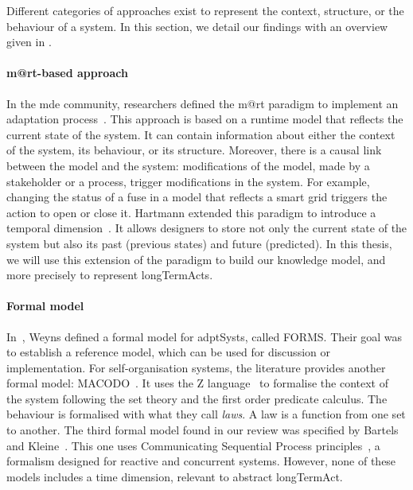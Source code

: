 Different categories of approaches exist to represent the \gls{context}, \gls{structure}, or the \gls{behaviour} of a system.
In this section, we detail our findings with an overview given in .

\paragraph{\Gls{m@rt}-based approach}
In the \gls{mde} community, researchers defined the \gls{m@rt} paradigm to implement an adaptation process~\cite{DBLP:journals/computer/BlairBF09, DBLP:journals/computer/MorinBJFS09}.
This approach is based on a runtime model that reflects the current state of the system.
It can contain information about either the \gls{context} of the system, its \gls{behaviour}, or its \gls{structure}.
Moreover, there is a causal link between the model and the system: modifications of the model, made by a stakeholder or a process, trigger modifications in the system.
For example, changing the status of a fuse in a model that reflects a smart grid triggers the action to open or close it.
Hartmann \etal extended this paradigm to introduce a temporal dimension~\cite{DBLP:conf/seke/0001FNMKT14, DBLP:conf/models/0001FNMKBT14}.
It allows designers to store not only the current state of the system but also its past (previous states) and future (predicted).
In this thesis, we will use this extension of the paradigm to build our knowledge model, and more precisely to represent \glspl{longTermAct}.

\paragraph{Formal model}
In~\cite{DBLP:journals/taas/WeynsMA12}, Weyns \etal defined a formal model for \glspl{adptSyst}, called FORMS.
Their goal was to establish a reference model, which can be used for discussion or implementation.
For self-organisation systems, the literature provides another formal model: MACODO~\cite{DBLP:journals/taas/WeynsHH10}.
It uses the Z language~\cite{DBLP:books/daglib/0011651} to formalise the context of the system following the set theory and the first order predicate calculus.
The \gls{behaviour} is formalised with what they call \textit{laws}.
A law is a function from one set to another.
The third formal model found in our review was specified by Bartels and Kleine~\cite{DBLP:conf/icse/BartelsK11}.
This one uses Communicating Sequential Process principles~\cite{DBLP:journals/cacm/Hoare78}, a formalism designed for reactive and concurrent systems.
However, none of these models includes a time dimension, relevant to abstract \gls{longTermAct}.

